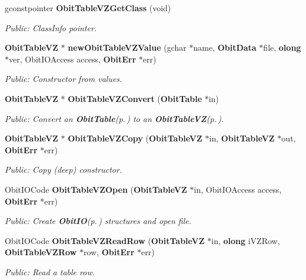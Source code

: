 \begin{CompactItemize}
gconstpointer {\bf Obit\-Table\-VZGet\-Class} (void)
\begin{CompactList}\small\item\em Public: Class\-Info pointer. \item\end{CompactList}\item 
{\bf Obit\-Table\-VZ} $\ast$ {\bf new\-Obit\-Table\-VZValue} (gchar $\ast$name, {\bf Obit\-Data} $\ast$file, {\bf olong} $\ast$ver, Obit\-IOAccess access, {\bf Obit\-Err} $\ast$err)
\begin{CompactList}\small\item\em Public: Constructor from values. \item\end{CompactList}\item 
{\bf Obit\-Table\-VZ} $\ast$ {\bf Obit\-Table\-VZConvert} ({\bf Obit\-Table} $\ast$in)
\begin{CompactList}\small\item\em Public: Convert an {\bf Obit\-Table}{\rm (p.\,\pageref{structObitTable})} to an {\bf Obit\-Table\-VZ}{\rm (p.\,\pageref{structObitTableVZ})}. \item\end{CompactList}\item 
{\bf Obit\-Table\-VZ} $\ast$ {\bf Obit\-Table\-VZCopy} ({\bf Obit\-Table\-VZ} $\ast$in, {\bf Obit\-Table\-VZ} $\ast$out, {\bf Obit\-Err} $\ast$err)
\begin{CompactList}\small\item\em Public: Copy (deep) constructor. \item\end{CompactList}\item 
Obit\-IOCode {\bf Obit\-Table\-VZOpen} ({\bf Obit\-Table\-VZ} $\ast$in, Obit\-IOAccess access, {\bf Obit\-Err} $\ast$err)
\begin{CompactList}\small\item\em Public: Create {\bf Obit\-IO}{\rm (p.\,\pageref{structObitIO})} structures and open file. \item\end{CompactList}\item 
Obit\-IOCode {\bf Obit\-Table\-VZRead\-Row} ({\bf Obit\-Table\-VZ} $\ast$in, {\bf olong} i\-VZRow, {\bf Obit\-Table\-VZRow} $\ast$row, {\bf Obit\-Err} $\ast$err)
\begin{CompactList}\small\item\em Public: Read a table row. \item\end{CompactList}\item 

\end{CompactItemize}
